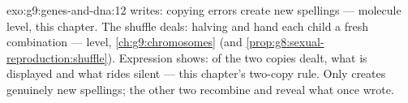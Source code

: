 \begin{solution}{exo:g9:genes-and-dna:12}
 writes: copying errors create new spellings ---
molecule level, this chapter. The shuffle deals: halving
and  hand each child a fresh combination ---
 level, \cref{ch:g9:chromosomes} (and
\cref{prop:g8:sexual-reproduction:shuffle}). Expression
shows: of the two copies dealt, what is displayed and what
rides silent --- this chapter's two-copy rule. Only
 creates genuinely new spellings; the other two
recombine and reveal what  once wrote.
\end{solution}

